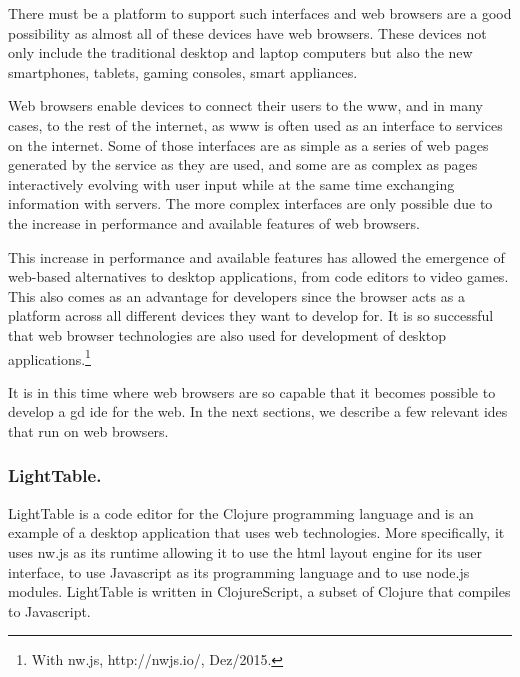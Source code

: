 \documentclass{./llncs2e/llncs}
\begin{document}
	There must be a platform to support such interfaces and web browsers are a good possibility as almost all of these devices have web browsers.
	These devices not only include the traditional desktop and laptop computers but also the new smartphones, tablets, gaming consoles, smart appliances.

	Web browsers enable devices to connect their users to the \ac{www}, and in many cases, to the rest of the internet, as \ac{www} is often used as an interface to services on the internet.
	Some of those interfaces are as simple as a series of web pages generated by the service as they are used, and some are as complex as pages interactively evolving with user input while at the same time exchanging information with servers.
	The more complex interfaces are only possible due to the increase in performance and available features of web browsers.

	This increase in performance and available features has allowed the emergence of web-based alternatives to desktop applications, from code editors to video games.
	This also comes as an advantage for developers since the browser acts as a platform across all different devices they want to develop for.
	It is so successful that web browser technologies are also used for development of desktop applications.\footnote{With nw.js, http://nwjs.io/, Dez/2015.}
	
	It is in this time where web browsers are so capable that it becomes possible to develop a \ac{gd} \ac{ide} for the web.
	In the next sections, we describe a few relevant \acp{ide} that run on web browsers.


\subsubsection{LightTable.}
	LightTable\cite{lighttable2015site} is a code editor for the Clojure programming language\cite{hickey2008clojure} and is an example of a desktop application that uses web technologies.
	More specifically, it uses nw.js as its runtime allowing it to use the html layout engine for its user interface, to use Javascript as its programming language and to use node.js\cite{tilkov2010node} modules.
	LightTable is written in ClojureScript\cite{10.1109/MIC.2011.148}, a subset of Clojure that compiles to Javascript.
\end{document}
